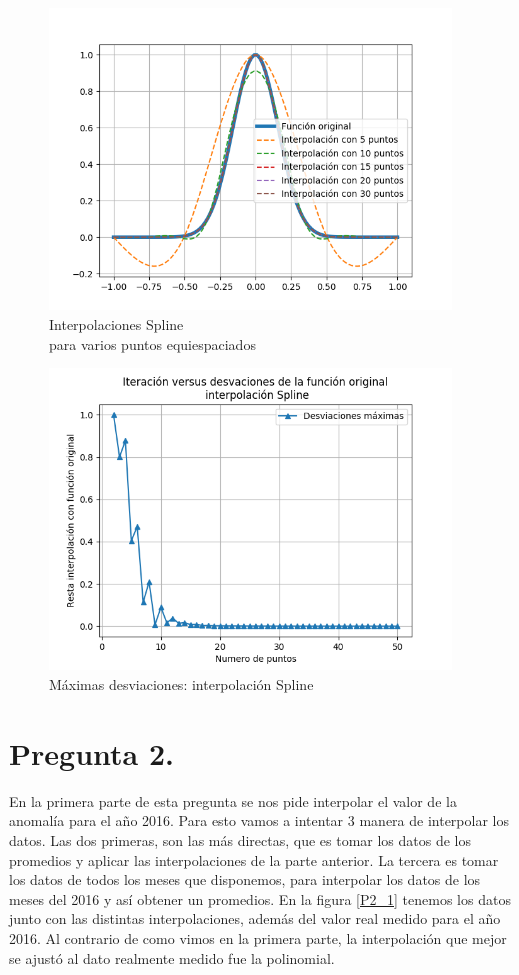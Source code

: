 \documentclass[letter, 11pt]{article}
\begin{document}
\begin{figure}[H]
  \centering
  \includegraphics[height=8cm]{P1_S_2.png}
  \caption{Interpolaciones Spline\\ para varios puntos equiespaciados}
  \label{P1_S_2}
\end{figure}


\begin{figure}[H]
  \centering
  \includegraphics[height=8cm]{P1_S_3.png}
  \caption{Máximas desviaciones: interpolación Spline}
  \label{P1_S_3}
\end{figure}




\newpage

\section{Pregunta 2.}


En la primera parte de esta pregunta se nos pide
interpolar el valor de la anomalía para el año 2016.
Para esto vamos a intentar 3 manera de interpolar los
datos. Las dos primeras, son las más directas, que es
tomar los datos de los promedios y aplicar las
interpolaciones de la parte anterior. La tercera es
tomar los datos de todos los meses que disponemos,
para interpolar los datos de los meses del 2016 y así
obtener un promedios.
En la figura \ref{P2_1} tenemos los datos junto con las distintas interpolaciones, además del valor real medido para el año 2016. Al contrario de como vimos en la primera parte, la interpolación que mejor se ajustó al dato realmente medido fue la polinomial.
\end{document}
